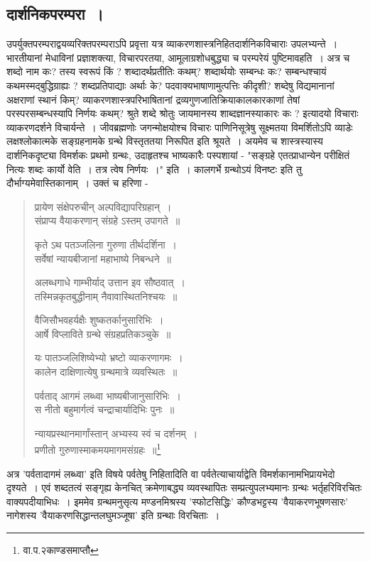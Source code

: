 \subsection*{दार्शनिकपरम्परा~।}
उपर्युक्तपरम्पराद्वयव्यरिक्तपरम्पराऽपि प्रवृत्ता यत्र व्याकरणशास्त्रनिहितदार्शनिकविचाराः उपलभ्यन्ते~। भारतीयानां मेधाविनां प्रज्ञाशक्त्या, विचारपरतया, आमूलाग्रशोधबुद्ध्या च परम्परेयं पुष्टिमावहति~। अत्र च शब्दो नाम कः? तस्य स्वरूपं किं ? शब्दादर्थप्रतीतिः कथम्? शब्दार्थयोः सम्बन्धः कः? सम्बन्धश्चायं कथमस्मद्बुद्धिग्राह्यः ? शब्दप्रतिपाद्याः अर्थाः के? पदवाक्यभाषाणामुत्पत्तिः कीदृशी? शब्देषु विद्यमानानां अक्षराणां स्थानं किम्? व्याकरणशास्त्रपरिभाषितानां द्रव्यगुणजातिक्रियाकालकारकाणां तेषां परस्परसम्बन्धस्यापि निर्णयः कथम्? श्रुते शब्दे श्रोतुः जायमानस्य शाब्दज्ञानस्याकारः कः ? इत्यादयो विचाराः व्याकरणदर्शने विचार्यन्ते~। जीवब्रह्मणोः जगन्मोक्षयोश्च विचारः पाणिनिसूत्रेषु सूक्ष्मतया विमर्शितोऽपि व्याडेः लक्षश्लोकात्मके सङ्ग्रहनामके ग्रन्थे विस्तृततया निरूपित इति श्रूयते~। अयमेव च शास्त्रस्यास्य दार्शनिकदृष्ट्या विमर्शकः प्रथमो ग्रन्थः, उदाहृतश्च भाष्यकारैः पस्पशायां - "सङ्ग्रहे एतत्प्राधान्येन परीक्षितं नित्यः शब्दः कार्यो वेति~।	तत्र त्वेष निर्णयः~।" इति~। कालगर्भे ग्रन्थोऽयं विनष्टः इति तु दौर्भाग्यमेवास्तिकानाम्~। उक्तं च हरिणा -
\begin{verse}
प्रायेण संक्षेपरुचीन् अल्पविद्यापरिग्रहान्~।\\
संप्राप्य वैयाकरणान् संग्रहे ऽस्तम् उपागते~॥

कृते ऽथ पतञ्जलिना गुरुणा तीर्थदर्शिना~।\\
सर्वेषां न्यायबीजानां महाभाष्ये निबन्धने~॥

अलब्धगाधे गाम्भीर्याद् उत्तान इव सौष्ठवात्~।\\
तस्मिन्नकृतबुद्धीनाम् नैवावास्थितनिश्चयः~॥

वैजिसौभवहर्यक्षैः शुष्कतर्कानुसारिभिः~।\\
आर्षे विप्लाविते ग्रन्थे संग्रहप्रतिकञ्चुके~॥

यः पातञ्जलिशिष्येभ्यो भ्रष्टो व्याकरणागमः~।\\
कालेन दाक्षिणात्येषु ग्रन्थमात्रे व्यवस्थितः~॥

पर्वताद् आगमं लब्ध्वा भाष्यबीजानुसारिभिः~।\\
स नीतो बहुमार्गत्वं चन्द्राचार्यादिभिः पुनः~॥

न्यायप्रस्थानमार्गांस्तान् अभ्यस्य स्वं च दर्शनम्~।\\
प्रणीतो गुरुणास्माकमयमागमसंग्रहः~॥\footnote{वा.प.२काण्डसमाप्तौ}
\end{verse}
अत्र 'पर्वतादागमं लब्ध्वा' इति विषये पर्वतेषु निहितादिति वा पर्वतेत्याचार्याद्वेति विमर्शकानामभिप्रायभेदो दृश्यते~। एवं शब्दतत्वं सङ्गृह्य केनचित् क्रमेणाबद्ध्य व्यवस्थापितः सम्प्रत्युपलभ्यमानः ग्रन्थः भर्तृहरिविरचितः वाक्यपदीयाभिधः~। इममेव ग्रन्थमनुसृत्य मण्डनमिश्रस्य 'स्फोटसिद्धिः' कौण्डभट्टस्य 'वैयाकरणभूषणसारः' नागेशस्य 'वैयाकरणसिद्धान्तलघुमञ्जूषा' इति ग्रन्थाः विरचिताः~।


